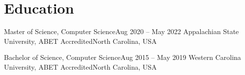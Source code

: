 \section{Education}
\cvSubHeadingListStart

  \cvSubHeading
    {Master of Science, Computer Science}{Aug 2020 -- May 2022}
    {Appalachian State University, ABET Accredited}{North Carolina, USA}
    \cvItemListStart
    \cvItemListEnd

  \cvSubHeading
    {Bachelor of Science, Computer Science}{Aug 2015 -- May 2019}
    {Western Carolina University, ABET Accredited}{North Carolina, USA}
    \cvItemListStart
    \cvItemListEnd

\cvSubHeadingListEnd
